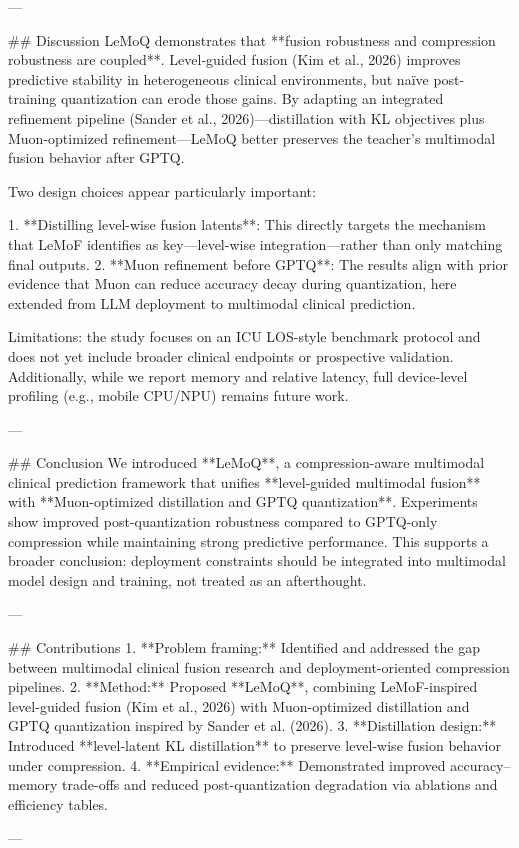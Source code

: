 ---

## Discussion  
LeMoQ demonstrates that **fusion robustness and compression robustness are coupled**. Level-guided fusion (Kim et al., 2026) improves predictive stability in heterogeneous clinical environments, but naïve post-training quantization can erode those gains. By adapting an integrated refinement pipeline (Sander et al., 2026)—distillation with KL objectives plus Muon-optimized refinement—LeMoQ better preserves the teacher’s multimodal fusion behavior after GPTQ.

Two design choices appear particularly important:

1. **Distilling level-wise fusion latents**: This directly targets the mechanism that LeMoF identifies as key—level-wise integration—rather than only matching final outputs.  
2. **Muon refinement before GPTQ**: The results align with prior evidence that Muon can reduce accuracy decay during quantization, here extended from LLM deployment to multimodal clinical prediction.

Limitations: the study focuses on an ICU LOS-style benchmark protocol and does not yet include broader clinical endpoints or prospective validation. Additionally, while we report memory and relative latency, full device-level profiling (e.g., mobile CPU/NPU) remains future work.

---

## Conclusion  
We introduced **LeMoQ**, a compression-aware multimodal clinical prediction framework that unifies **level-guided multimodal fusion** with **Muon-optimized distillation and GPTQ quantization**. Experiments show improved post-quantization robustness compared to GPTQ-only compression while maintaining strong predictive performance. This supports a broader conclusion: deployment constraints should be integrated into multimodal model design and training, not treated as an afterthought.

---

## Contributions  
1. **Problem framing:** Identified and addressed the gap between multimodal clinical fusion research and deployment-oriented compression pipelines.  
2. **Method:** Proposed **LeMoQ**, combining LeMoF-inspired level-guided fusion (Kim et al., 2026) with Muon-optimized distillation and GPTQ quantization inspired by Sander et al. (2026).  
3. **Distillation design:** Introduced **level-latent KL distillation** to preserve level-wise fusion behavior under compression.  
4. **Empirical evidence:** Demonstrated improved accuracy–memory trade-offs and reduced post-quantization degradation via ablations and efficiency tables.

---